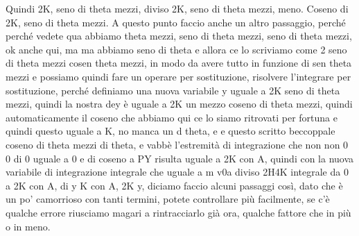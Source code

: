 {\begin{soluzione}
   Quindi 2K, seno di theta mezzi, diviso 2K, seno di theta mezzi, meno. Coseno di 2K, seno di theta mezzi. A questo punto faccio anche un altro passaggio, perché perché vedete qua abbiamo theta mezzi, seno di theta mezzi, seno di theta mezzi, ok anche qui, ma ma abbiamo seno di theta e allora ce lo scriviamo come 2 seno di theta mezzi cosen theta mezzi, in modo da avere tutto in funzione di sen theta mezzi e possiamo quindi fare un operare per sostituzione, risolvere l'integrare per sostituzione, perché definiamo una nuova variabile y uguale a 2K seno di theta mezzi, quindi la nostra dey è uguale a 2K un mezzo coseno di theta mezzi, quindi automaticamente il coseno che abbiamo qui ce lo siamo ritrovati per fortuna e quindi questo uguale a K, no manca un d theta, e e questo scritto beccoppale coseno di theta mezzi di theta, e vabbè l'estremità di integrazione che non non 0 0 di 0 uguale a 0 e di coseno a PY risulta uguale a 2K con A, quindi con la nuova variabile di integrazione integrale che uguale a m v0a diviso 2H4K integrale da 0 a 2K con A, di y K con A, 2K y, diciamo faccio alcuni passaggi così, dato che è un po' camorrioso con tanti termini, potete controllare più facilmente, se c'è qualche errore riusciamo magari a rintracciarlo già ora, qualche fattore che in più o in meno. 
   

\end{soluzione}}
